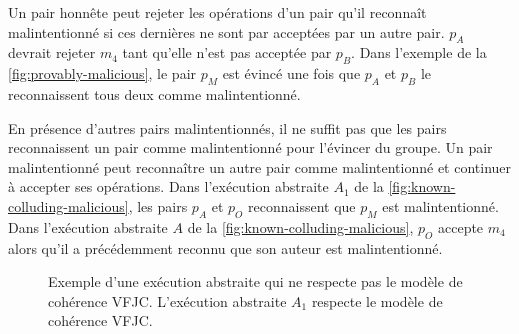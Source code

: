 Un pair honnête peut rejeter les opérations d'un pair qu'il reconnaît malintentionné si ces dernières ne sont par acceptées par un autre pair.
$p_A$ devrait rejeter $m_4$ tant qu'elle n'est pas acceptée par $p_B$.
Dans l'exemple de la \autoref{fig:provably-malicious}, le pair $p_M$ est évincé une fois que $p_A$ et $p_B$ le reconnaissent tous deux comme malintentionné.

En présence d'autres pairs malintentionnés, il ne suffit pas que les pairs reconnaissent un pair comme malintentionné pour l'évincer du groupe.
Un pair malintentionné peut reconnaître un autre pair comme malintentionné et continuer à accepter ses opérations.
Dans l'exécution abstraite $A_1$ de la \autoref{fig:known-colluding-malicious}, les pairs $p_A$ et $p_O$ reconnaissent que $p_M$ est malintentionné.
Dans l'exécution abstraite $A$ de la \autoref{fig:known-colluding-malicious}, $p_O$ accepte $m_4$ alors qu'il a précédemment reconnu que son auteur est malintentionné.

\begin{figure}[htb]
\centering
{}
\caption[Exécution abstraite qui ne respecte pas le modèle de cohérence \acs{VFJC}]{Exemple d'une exécution abstraite qui ne respecte pas le modèle de cohérence \ac{VFJC}.
L'exécution abstraite $A_1$ respecte le modèle de cohérence \ac{VFJC}.}\label{fig:known-colluding-malicious}
\end{figure}

